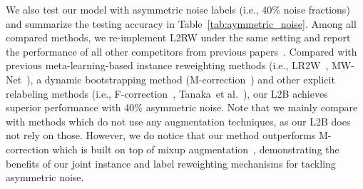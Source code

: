 \documentclass{article}
\begin{document}
\begin{table}[t]
        \centering
        \caption{Comparison with different methods in test accuracy (\%) on CIFAR-100 with symmetric noise. \emph{NF} stands for the noise fraction.
        }
        \vspace{-.5em}
        \label{tab:cifar100_comparison}
        \vspace{-.5em}
\end{table}

We also test our model with asymmetric noise labels (i.e., 40\% noise fractions) and summarize the testing accuracy in Table~\ref{tab:aymmetric_noise}. 
Among all compared methods, we re-implement L2RW under the same setting and report the performance of all other competitors from previous papers~\cite{kim2019nlnl,Kim_2021_CVPR,li2020dividemix}.
Compared with previous meta-learning-based instance reweighting methods (i.e., LR2W~\cite{ren2018learning}, MW-Net~\cite{shu2019meta}), a dynamic bootstrapping method (M-correction~\cite{arazo2019unsupervised}) and other explicit relabeling methods (i.e., F-correction~\cite{patrini2017making}, Tanaka~et al.~\cite{tanaka2018joint}), our L2B achieves superior performance with 40\% asymmetric noise. Note that we mainly compare with methods which do not use any augmentation techniques, as our L2B does not rely on those. However, we do notice that our method outperforms M-correction which is built on top of mixup augmentation~\cite{zhang2018mixup}, demonstrating the benefits of our joint instance and label reweighting mechanisms for tackling asymmetric noise.
\end{document}
